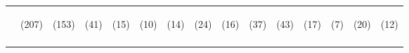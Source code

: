 \begin{tabular}{lcccccccccccccc}
 & \begin{footnotesize}(207)\end{footnotesize} & \begin{footnotesize}(153)\end{footnotesize} & \begin{footnotesize}(41)\end{footnotesize} & \begin{footnotesize}(15)\end{footnotesize} & \begin{footnotesize}(10)\end{footnotesize} & \begin{footnotesize}(14)\end{footnotesize} & \begin{footnotesize}(24)\end{footnotesize} & \begin{footnotesize}(16)\end{footnotesize} & \begin{footnotesize}(37)\end{footnotesize} & \begin{footnotesize}(43)\end{footnotesize} & \begin{footnotesize}(17)\end{footnotesize} & \begin{footnotesize}(7)\end{footnotesize} & \begin{footnotesize}(20)\end{footnotesize} & \begin{footnotesize}(12)\end{footnotesize}\\
\noalign{\smallskip}\hline\end{tabular}\\
